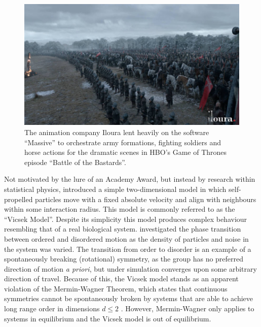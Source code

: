 \begin{figure}[tb]
  \includegraphics[width=\textwidth]{GOT.jpg}
  \caption{The animation company Iloura lent heavily on the software
    ``Massive'' to orchestrate army formations, fighting soldiers and horse
    actions for the dramatic scenes in HBO's Game of Thrones episode ``Battle
    of the Bastards''.}
  \label{fig:got}
\end{figure}

Not motivated by the lure of an Academy Award, but instead by research within
statistical physics, \textcite{vicsek95} introduced a simple two-dimensional
model in which self-propelled particles move with a fixed absolute velocity and
align with neighbours within some interaction radius. This model is commonly
referred to as the ``Vicsek Model''. Despite its simplicity this model produces
complex behaviour resembling that of a real biological system.
\textcite{vicsek95} investigated the phase transition between ordered and
disordered motion as the density of particles and noise in the system was
varied. The transition from order to disorder is an example of a spontaneously
breaking (rotational) symmetry, as the group has no preferred direction of
motion \emph{a priori}, but under simulation converges upon some arbitrary
direction of travel. Because of this, the Vicsek model stands as an apparent
violation of the Mermin-Wagner Theorem, which states that continuous symmetries
cannot be spontaneously broken by systems that are able to achieve long range
order in dimensions $d\leq 2$ \parencite{mermin66}. However, Mermin-Wagner only
applies to systems in equilibrium and the Vicsek model is out of equilibrium.

